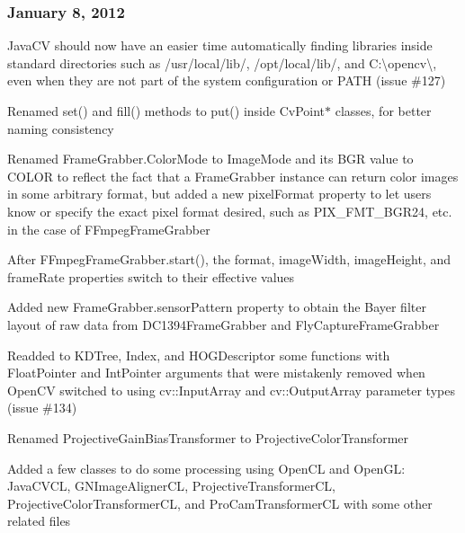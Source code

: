 \subsubsection*{January 8, 2012}


\begin{DoxyItemize}
\item Java\+C\+V should now have an easier time automatically finding libraries inside standard directories such as {\ttfamily /usr/local/lib/}, {\ttfamily /opt/local/lib/}, and {\ttfamily C\+:\textbackslash{}opencv\textbackslash{}}, even when they are not part of the system configuration or P\+A\+T\+H (issue \#127)
\item Renamed {\ttfamily set()} and {\ttfamily fill()} methods to {\ttfamily put()} inside {\ttfamily Cv\+Point$\ast$} classes, for better naming consistency
\item Renamed {\ttfamily Frame\+Grabber.\+Color\+Mode} to {\ttfamily Image\+Mode} and its {\ttfamily B\+G\+R} value to {\ttfamily C\+O\+L\+O\+R} to reflect the fact that a {\ttfamily Frame\+Grabber} instance can return color images in some arbitrary format, but added a new {\ttfamily pixel\+Format} property to let users know or specify the exact pixel format desired, such as {\ttfamily P\+I\+X\+\_\+\+F\+M\+T\+\_\+\+B\+G\+R24}, etc. in the case of {\ttfamily F\+Fmpeg\+Frame\+Grabber}
\item After {\ttfamily F\+Fmpeg\+Frame\+Grabber.\+start()}, the {\ttfamily format}, {\ttfamily image\+Width}, {\ttfamily image\+Height}, and {\ttfamily frame\+Rate} properties switch to their effective values
\item Added new {\ttfamily Frame\+Grabber.\+sensor\+Pattern} property to obtain the Bayer filter layout of raw data from {\ttfamily D\+C1394\+Frame\+Grabber} and {\ttfamily Fly\+Capture\+Frame\+Grabber}
\item Readded to {\ttfamily K\+D\+Tree}, {\ttfamily Index}, and {\ttfamily H\+O\+G\+Descriptor} some functions with {\ttfamily Float\+Pointer} and {\ttfamily Int\+Pointer} arguments that were mistakenly removed when Open\+C\+V switched to using {\ttfamily cv\+::\+Input\+Array} and {\ttfamily cv\+::\+Output\+Array} parameter types (issue \#134)
\item Renamed {\ttfamily Projective\+Gain\+Bias\+Transformer} to {\ttfamily Projective\+Color\+Transformer}
\item Added a few classes to do some processing using Open\+C\+L and Open\+G\+L\+: {\ttfamily Java\+C\+V\+C\+L}, {\ttfamily G\+N\+Image\+Aligner\+C\+L}, {\ttfamily Projective\+Transformer\+C\+L}, {\ttfamily Projective\+Color\+Transformer\+C\+L}, and {\ttfamily Pro\+Cam\+Transformer\+C\+L} with some other related files

\end{DoxyItemize}
